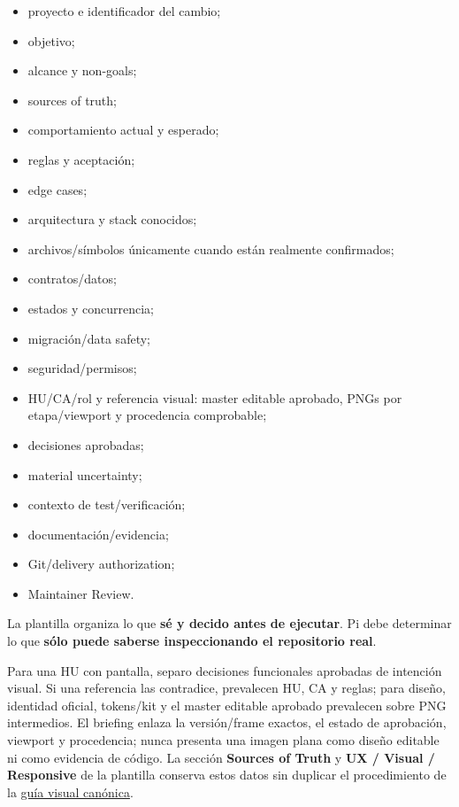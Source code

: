 \documentclass[11pt,a4paper]{article}
\begin{document}
\begin{itemize}
    \item proyecto e identificador del cambio;
    \item objetivo;
    \item alcance y non-goals;
    \item sources of truth;
    \item comportamiento actual y esperado;
    \item reglas y aceptación;
    \item edge cases;
    \item arquitectura y stack conocidos;
    \item archivos/símbolos únicamente cuando están realmente confirmados;
    \item contratos/datos;
    \item estados y concurrencia;
    \item migración/data safety;
    \item seguridad/permisos;
    \item HU/CA/rol y referencia visual: master editable aprobado, PNGs por etapa/viewport y procedencia comprobable;
    \item decisiones aprobadas;
    \item material uncertainty;
    \item contexto de test/verificación;
    \item documentación/evidencia;
    \item Git/delivery authorization;
    \item Maintainer Review.
\end{itemize}

\begin{principlebox}
La plantilla organiza lo que \textbf{sé y decido antes de ejecutar}. Pi debe determinar lo que \textbf{sólo puede saberse inspeccionando el repositorio real}.
\end{principlebox}

Para una HU con pantalla, separo decisiones funcionales aprobadas de intención visual. Si una referencia las contradice, prevalecen HU, CA y reglas; para diseño, identidad oficial, tokens/kit y el master editable aprobado prevalecen sobre PNG intermedios. El briefing enlaza la versión/frame exactos, el estado de aprobación, viewport y procedencia; nunca presenta una imagen plana como diseño editable ni como evidencia de código. La sección \textbf{Sources of Truth} y \textbf{UX / Visual / Responsive} de la plantilla conserva estos datos sin duplicar el procedimiento de la \href{https://github.com/Alex-Fernandez-2003/workflow-with-gentle-ai/blob/docs/workflow-showcase/docs/ux/flujo-referencias-visuales.md}{guía visual canónica}.
\end{document}
